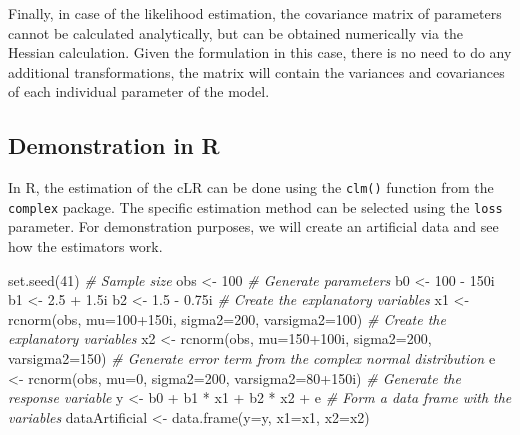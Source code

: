 \documentclass[
]{book}
\newenvironment{Shaded}{\begin{snugshade}}{\end{snugshade}}
\newcommand{\AttributeTok}[1]{\textcolor[rgb]{0.77,0.63,0.00}{#1}}
\newcommand{\CommentTok}[1]{\textcolor[rgb]{0.56,0.35,0.01}{\textit{#1}}}
\newcommand{\DecValTok}[1]{\textcolor[rgb]{0.00,0.00,0.81}{#1}}
\newcommand{\FloatTok}[1]{\textcolor[rgb]{0.00,0.00,0.81}{#1}}
\newcommand{\FunctionTok}[1]{\textcolor[rgb]{0.00,0.00,0.00}{#1}}
\newcommand{\NormalTok}[1]{#1}
\newcommand{\OtherTok}[1]{\textcolor[rgb]{0.56,0.35,0.01}{#1}}
\newcommand{\SpecialCharTok}[1]{\textcolor[rgb]{0.00,0.00,0.00}{#1}}
\begin{document}
Finally, in case of the likelihood estimation, the covariance matrix of parameters cannot be calculated analytically, but can be obtained numerically via the Hessian calculation. Given the formulation in this case, there is no need to do any additional transformations, the matrix will contain the variances and covariances of each individual parameter of the model.

\hypertarget{demonstration-in-r}{%
\subsection{Demonstration in R}\label{demonstration-in-r}}

In R, the estimation of the cLR can be done using the \texttt{clm()} function from the \texttt{complex} package. The specific estimation method can be selected using the \texttt{loss} parameter. For demonstration purposes, we will create an artificial data and see how the estimators work.

\begin{Shaded}
\begin{Highlighting}[]
\FunctionTok{set.seed}\NormalTok{(}\DecValTok{41}\NormalTok{)}
\CommentTok{\# Sample size}
\NormalTok{obs }\OtherTok{\textless{}{-}} \DecValTok{100}
\CommentTok{\# Generate parameters}
\NormalTok{b0 }\OtherTok{\textless{}{-}} \DecValTok{100} \SpecialCharTok{{-}}\NormalTok{ 150i}
\NormalTok{b1 }\OtherTok{\textless{}{-}} \FloatTok{2.5} \SpecialCharTok{+} \FloatTok{1.5}\NormalTok{i}
\NormalTok{b2 }\OtherTok{\textless{}{-}} \FloatTok{1.5} \SpecialCharTok{{-}} \FloatTok{0.75}\NormalTok{i}
\CommentTok{\# Create the explanatory variables}
\NormalTok{x1 }\OtherTok{\textless{}{-}} \FunctionTok{rcnorm}\NormalTok{(obs, }\AttributeTok{mu=}\DecValTok{100}\SpecialCharTok{+}\NormalTok{150i, }\AttributeTok{sigma2=}\DecValTok{200}\NormalTok{, }\AttributeTok{varsigma2=}\DecValTok{100}\NormalTok{)}
\CommentTok{\# Create the explanatory variables}
\NormalTok{x2 }\OtherTok{\textless{}{-}} \FunctionTok{rcnorm}\NormalTok{(obs, }\AttributeTok{mu=}\DecValTok{150}\SpecialCharTok{+}\NormalTok{100i, }\AttributeTok{sigma2=}\DecValTok{200}\NormalTok{, }\AttributeTok{varsigma2=}\DecValTok{150}\NormalTok{)}
\CommentTok{\# Generate error term from the complex normal distribution}
\NormalTok{e }\OtherTok{\textless{}{-}} \FunctionTok{rcnorm}\NormalTok{(obs, }\AttributeTok{mu=}\DecValTok{0}\NormalTok{, }\AttributeTok{sigma2=}\DecValTok{200}\NormalTok{, }\AttributeTok{varsigma2=}\DecValTok{80}\SpecialCharTok{+}\NormalTok{150i)}
\CommentTok{\# Generate the response variable}
\NormalTok{y }\OtherTok{\textless{}{-}}\NormalTok{ b0 }\SpecialCharTok{+}\NormalTok{ b1 }\SpecialCharTok{*}\NormalTok{ x1 }\SpecialCharTok{+}\NormalTok{ b2 }\SpecialCharTok{*}\NormalTok{ x2 }\SpecialCharTok{+}\NormalTok{ e}
\CommentTok{\# Form a data frame with the variables}
\NormalTok{dataArtificial }\OtherTok{\textless{}{-}} \FunctionTok{data.frame}\NormalTok{(}\AttributeTok{y=}\NormalTok{y, }\AttributeTok{x1=}\NormalTok{x1, }\AttributeTok{x2=}\NormalTok{x2)}
\end{Highlighting}
\end{Shaded}
\end{document}
